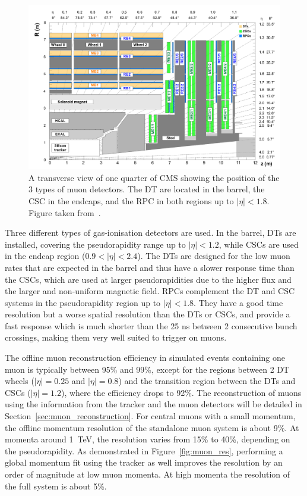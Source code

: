 \begin{figure}[ht]
  \centering
 \includegraphics[width=.95\textwidth]{muon_system_new}
 \caption{A transverse view of one quarter of \ac{CMS} showing the position of the 3 types of muon detectors. The \protect\acf{DT} are located in the barrel, the \protect\acf{CSC} in the endcaps, and the \protect\acf{RPC} in both regions up to $|\eta| < 1.8$. Figure taken from~\cite{Abbiendi:2015txa}.}
 \label{fig:muons}
\end{figure}

Three different types of gas-ionisation detectors are used. In the barrel, \acp{DT} are installed, covering the pseudorapidity range up to $|\eta| < 1.2$, while \acp{CSC} are used in the endcap region ($0.9 < |\eta| < 2.4$). The \acp{DT} are designed for the low muon rates that are expected in the barrel and thus have a slower response time than the \acp{CSC}, which are used at larger pseudorapidities due to the higher flux and the larger and non-uniform magnetic field. \acp{RPC} complement the \ac{DT} and \ac{CSC} systems in the pseudorapidity region up to $|\eta| < 1.8$. They have a good time resolution but a worse spatial resolution than the \acp{DT} or \acp{CSC}, and provide a fast response which is much shorter than the 25 ns between 2 consecutive bunch crossings, making them very well suited to trigger on muons.

The offline muon reconstruction efficiency in simulated events containing one muon is typically between 95\% and 99\%, except for the regions between 2 \ac{DT} wheels ($|\eta| = 0.25$ and $|\eta| = 0.8$) and the transition region between the \acp{DT} and \acp{CSC} ($|\eta| = 1.2$), where the efficiency drops to 92\%. The reconstruction of muons using the information from the tracker and the muon detectors will be detailed in Section~\ref{sec:muon_reconstruction}. For central muons with a small momentum, the offline momentum resolution of the standalone muon system is about 9\%. At momenta around \SI{1}{TeV}, the resolution varies from 15\% to 40\%, depending on the pseudorapidity. As demonstrated in Figure~\ref{fig:muon_res}, performing a global momentum fit using the tracker as well improves the resolution by an order of magnitude at low muon momenta. At high momenta the resolution of the full system is about 5\%.

